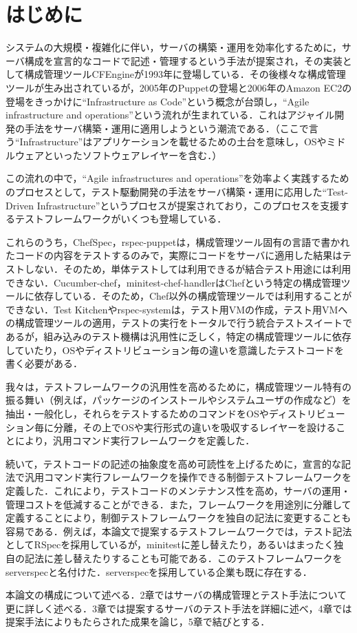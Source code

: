 \section{はじめに}

システムの大規模・複雑化に伴い，サーバの構築・運用を効率化するために，サーバ構成を宣言的なコードで記述・管理するという手法が提案され，その実装として構成管理ツールCFEngine\cite{cfengine}が1993年に登場している．その後様々な構成管理ツールが生み出されているが\cite{cmt}，2005年のPuppetの登場\cite{puppet}と2006年のAmazon EC2の登場\cite{ec2}をきっかけに``Infrastructure as Code''という概念が台頭し，``Agile infrastructure and operations''\cite{agile infrastructure}という流れが生まれている．これはアジャイル開発の手法をサーバ構築・運用に適用しようという潮流である．（ここで言う``Infrastructure''はアプリケーションを載せるための土台を意味し，OSやミドルウェアといったソフトウェアレイヤーを含む．）

この流れの中で，``Agile infrastructures and operations''を効率よく実践するためのプロセスとして，テスト駆動開発の手法をサーバ構築・運用に応用した``Test-Driven Infrastructure''\cite{test driven infrastructure with chef}というプロセスが提案されており，このプロセスを支援するテストフレームワークがいくつも登場している\cite{chefspec}\cite{rspec-puppet}\cite{cucumber-chef}\cite{minitest-chef-handler}\cite{test kitchen}\cite{rspec-system}．

これらのうち，ChefSpec，rspec-puppetは，構成管理ツール固有の言語で書かれたコードの内容をテストするのみで，実際にコードをサーバに適用した結果はテストしない．そのため，単体テストしては利用できるが結合テスト用途には利用できない．Cucumber-chef，minitest-chef-handlerはChefという特定の構成管理ツールに依存している．そのため，Chef以外の構成管理ツールでは利用することができない．Test Kitchenやrspec-systemは，テスト用VMの作成，テスト用VMへの構成管理ツールの適用，テストの実行をトータルで行う統合テストスイートであるが，組み込みのテスト機構は汎用性に乏しく，特定の構成管理ツールに依存していたり，OSやディストリビューション毎の違いを意識したテストコードを書く必要がある．

我々は，テストフレームワークの汎用性を高めるために，構成管理ツール特有の振る舞い（例えば，パッケージのインストールやシステムユーザの作成など）を抽出・一般化し，それらをテストするためのコマンドをOSやディストリビューション毎に分離，その上でOSや実行形式の違いを吸収するレイヤーを設けることにより，汎用コマンド実行フレームワークを定義した．

続いて，テストコードの記述の抽象度を高め可読性を上げるために，宣言的な記法で汎用コマンド実行フレームワークを操作できる制御テストフレームワークを定義した．これにより，テストコードのメンテナンス性を高め，サーバの運用・管理コストを低減することができる．また，フレームワークを用途別に分離して定義することにより，制御テストフレームワークを独自の記法に変更することも容易である．例えば，本論文で提案するテストフレームワークでは，テスト記法としてRSpec\cite{rspec}を採用しているが，minitest\cite{minitest}に差し替えたり，あるいはまったく独自の記法に差し替えたりすることも可能である．このテストフレームワークをserverspec\cite{serverspec}と名付けた．serverspecを採用している企業も既に存在する\cite{nintendo}．

本論文の構成について述べる．2章ではサーバの構成管理とテスト手法について更に詳しく述べる．3章では提案するサーバのテスト手法を詳細に述べ，4章では提案手法によりもたらされた成果を論じ，5章で結びとする．
